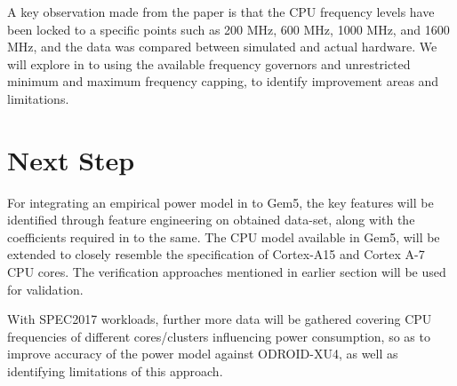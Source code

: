 \documentclass[conference]{IEEEtran}
\begin{document}
    \par A key observation made from the paper is that the CPU frequency levels have been locked to a specific points such as 200 MHz, 600 MHz, 1000 MHz, and 1600 MHz, and the data was compared between simulated and actual hardware. We will explore in to using the available frequency governors and unrestricted minimum and maximum frequency capping, to identify improvement areas and limitations.
    \medbreak

\section{Next Step}
    \par For integrating an empirical power model in to Gem5, the key features will be identified through feature engineering on obtained data-set, along with the coefficients required in to the same. The CPU model available in Gem5, will be extended to closely resemble the specification of Cortex-A15 and Cortex A-7 CPU cores. The verification approaches mentioned in earlier section will be used for validation.

    \par With SPEC2017 workloads, further more data will be gathered covering CPU frequencies of different cores/clusters influencing power consumption, so as to improve accuracy of the power model against ODROID-XU4, as well as identifying limitations of this approach.
    \medbreak




\end{document}
